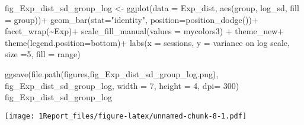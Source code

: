 \documentclass[
]{article}
\newenvironment{Shaded}{\begin{snugshade}}{\end{snugshade}}
\newcommand{\AttributeTok}[1]{\textcolor[rgb]{0.77,0.63,0.00}{#1}}
\newcommand{\DecValTok}[1]{\textcolor[rgb]{0.00,0.00,0.81}{#1}}
\newcommand{\FunctionTok}[1]{\textcolor[rgb]{0.00,0.00,0.00}{#1}}
\newcommand{\NormalTok}[1]{#1}
\newcommand{\OtherTok}[1]{\textcolor[rgb]{0.56,0.35,0.01}{#1}}
\newcommand{\SpecialCharTok}[1]{\textcolor[rgb]{0.00,0.00,0.00}{#1}}
\newcommand{\StringTok}[1]{\textcolor[rgb]{0.31,0.60,0.02}{#1}}
\begin{document}
\begin{Shaded}
\begin{Highlighting}[]
\NormalTok{fig\_Exp\_dist\_sd\_group\_log }\OtherTok{\textless{}{-}} \FunctionTok{ggplot}\NormalTok{(}\AttributeTok{data =}\NormalTok{ Exp\_dist, }\FunctionTok{aes}\NormalTok{(group, log\_sd, }\AttributeTok{fill =}\NormalTok{ group))}\SpecialCharTok{+}
  \FunctionTok{geom\_bar}\NormalTok{(}\AttributeTok{stat=}\StringTok{"identity"}\NormalTok{, }\AttributeTok{position=}\FunctionTok{position\_dodge}\NormalTok{())}\SpecialCharTok{+}
  \FunctionTok{facet\_wrap}\NormalTok{(}\SpecialCharTok{\textasciitilde{}}\NormalTok{Exp)}\SpecialCharTok{+}
  \FunctionTok{scale\_fill\_manual}\NormalTok{(}\AttributeTok{values =}\NormalTok{ mycolors3) }\SpecialCharTok{+}
\NormalTok{  theme\_new}\SpecialCharTok{+} \FunctionTok{theme}\NormalTok{(}\AttributeTok{legend.position=}\StringTok{\textquotesingle{}bottom\textquotesingle{}}\NormalTok{)}\SpecialCharTok{+}
  \FunctionTok{labs}\NormalTok{(}\AttributeTok{x =} \StringTok{\textquotesingle{}sessions\textquotesingle{}}\NormalTok{, }\AttributeTok{y =} \StringTok{\textquotesingle{}variance on log scale\textquotesingle{}}\NormalTok{, }\AttributeTok{size =}\DecValTok{5}\NormalTok{,  }\AttributeTok{fill =} \StringTok{\textquotesingle{}range\textquotesingle{}}\NormalTok{)}

\FunctionTok{ggsave}\NormalTok{(}\FunctionTok{file.path}\NormalTok{(}\StringTok{\textquotesingle{}figures\textquotesingle{}}\NormalTok{,}\StringTok{\textquotesingle{}fig\_Exp\_dist\_sd\_group\_log.png\textquotesingle{}}\NormalTok{), fig\_Exp\_dist\_sd\_group\_log, }\AttributeTok{width =} \DecValTok{7}\NormalTok{, }\AttributeTok{height =} \DecValTok{4}\NormalTok{, }\AttributeTok{dpi=} \DecValTok{300}\NormalTok{)}
\NormalTok{fig\_Exp\_dist\_sd\_group\_log}
\end{Highlighting}
\end{Shaded}

\texttt{[image: 1Report\_files/figure-latex/unnamed-chunk-8-1.pdf]}
\end{document}
